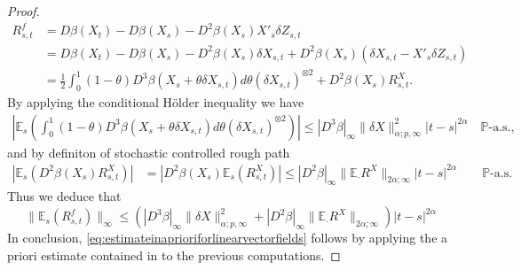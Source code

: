 \documentclass[11pt,a4paper]{article}
\newcommand{\E}{\mathbb{E}}
\theoremstyle{plain}
\begin{document}
\begin{proof}
    \begin{equation*}
        \begin{aligned}
            R^f_{s,t} &= D\beta(X_t)-D\beta(X_s) - D^2\beta(X_s)X'_s \delta Z_{s,t} \\
            &= D\beta(X_t)-D\beta(X_s) - D^2\beta(X_s)\delta{X}_{s,t} + D^2\beta(X_s)(\delta{X}_{s,t}- X'_s \delta Z_{s,t}) \\ 
            &= \frac{1}{2}  \int_0^1 (1-\theta) D^3\beta(X_s +\theta \delta{X}_{s,t}) d\theta (\delta{X}_{s,t})^{\otimes 2}  + D^2\beta(X_s)R^X_{s,t}. 
        \end{aligned}
    \end{equation*} 
    By applying the conditional Hölder inequality we have \begin{equation*}
        \begin{aligned}
            |\E_s(\int_0^1 (1-\theta) D^3\beta(X_s +\theta \delta{X}_{s,t}) d\theta (\delta{X}_{s,t})^{\otimes 2} ) | %
            \le |D^3\beta|_\infty \|\delta{X}\|_{\alpha;p,\infty}^2 |t-s|^{2\alpha}   \quad \text{$\mathbb{P}$-a.s.},
        \end{aligned}
    \end{equation*} and by definiton of stochastic controlled rough path \begin{equation*}
        \begin{aligned}
            |\E_s(D^2\beta(X_s)R^X_{s,t})| &= |D^2\beta(X_s)\E_s(R^X_{s,t})|
            \le  |D^2\beta|_\infty \|\E_\cdot R^X\|_{2\alpha;\infty}|t-s|^{2\alpha} \qquad \text{$\mathbb{P}$-a.s.}
        \end{aligned}
    \end{equation*} 
    Thus we deduce that \begin{equation*} \label{eq:normoftheremainderinconsistencyforvecotrfields}
        \|\E_s(R^f_{s,t})\|_\infty \le (|D^3\beta|_\infty \|\delta{X}\|_{\alpha;p,\infty}^2+|D^2\beta|_\infty \|\E_\cdot R^X\|_{2\alpha;\infty})|t-s|^{2\alpha}
    \end{equation*}
    In conclusion, \eqref{eq:estimateinaprioriforlinearvectorfields} follows by applying the a priori estimate contained in \cite[Proposition 4.5]{FHL21} to the previous computations.   
\end{proof}
\end{document}
